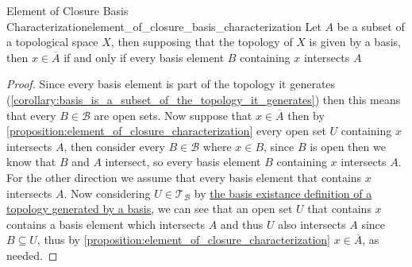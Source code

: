 \begin{proposition}{Element of Closure Basis
Characterization}{element_of_closure_basis_characterization}
Let \( A \) be a subset of a topological space \( X \), then
supposing that the topology of \( X \) is given by a basis, then \( x \in 
\overline{A}  \) if and only if every basis element \( B \) containing \( x \)
intersects \( A \) 
\end{proposition}
\begin{proof}
Since every basis element is part of the topology it generates
(\ref{corollary:basis_is_a_subset_of_the_topology_it_generates}) then this means
that every \( B \in  \mathcal{ B }   \) are open sets. Now suppose that \( x \in
\overline{A} \) then by \ref{proposition:element_of_closure_characterization}
every open set \( U \) containing \( x \) intersects \( A \), then consider
every \( B \in  \mathcal{ B }   \) where \( x \in  B \), since \( B \) is open
then we know that \( B \) and \( A \) intersect, so every basis element \( B \)
containing \( x \) intersects \( A \). \\
For the other direction we assume that every basis element that contains \( x \)
intersects \( A \). Now considering \( U \in \mathcal{ T } _{ \mathcal{ B }   }
\) by \hyperref[definition:topology_generated_by_a_basis_(basis_existance)]{the
basis existance definition of a topology generated by a basis}, we can see that
an open set \( U \) that contains \( x \) contains a basis element which
intersects \( A \) and thus \( U \) also intersects \( A \) since \( B \subseteq
U\), thus by \ref{proposition:element_of_closure_characterization} \( x \in
\overline{A}  \), as needed.
\end{proof}
